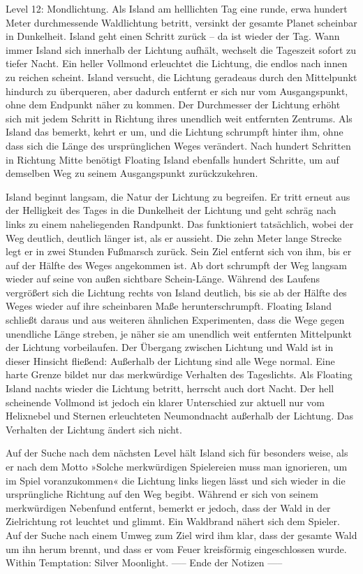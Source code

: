     Level 12: Mondlichtung. Als Island am helllichten Tag eine runde, erwa hundert Meter durchmessende Waldlichtung betritt, versinkt der gesamte Planet scheinbar in Dunkelheit. Island geht einen Schritt zurück – da ist wieder der Tag. Wann immer Island sich innerhalb der Lichtung aufhält, wechselt die Tageszeit sofort zu tiefer Nacht. Ein heller Vollmond erleuchtet die Lichtung, die endlos nach innen zu reichen scheint. Island versucht, die Lichtung geradeaus durch den Mittelpunkt hindurch zu überqueren, aber dadurch entfernt er sich nur vom Ausgangspunkt, ohne dem Endpunkt näher zu kommen. Der Durchmesser der Lichtung erhöht sich mit jedem Schritt in Richtung ihres unendlich weit entfernten Zentrums. Als Island das bemerkt, kehrt er um, und die Lichtung schrumpft hinter ihm, ohne dass sich die Länge des ursprünglichen Weges verändert. Nach hundert Schritten in Richtung Mitte benötigt Floating Island ebenfalls hundert Schritte, um auf demselben Weg zu seinem Ausgangspunkt zurückzukehren.

    Island beginnt langsam, die Natur der Lichtung zu begreifen. Er tritt erneut aus der Helligkeit des Tages in die Dunkelheit der Lichtung und geht schräg nach links zu einem naheliegenden Randpunkt. Das funktioniert tatsächlich, wobei der Weg deutlich, deutlich länger ist, als er aussieht. Die zehn Meter lange Strecke legt er in zwei Stunden Fußmarsch zurück. Sein Ziel entfernt sich von ihm, bis er auf der Hälfte des Weges angekommen ist. Ab dort schrumpft der Weg langsam wieder auf seine von außen sichtbare Schein-Länge. Während des Laufens vergrößert sich die Lichtung rechts von Island deutlich, bis sie ab der Hälfte des Weges wieder auf ihre scheinbaren Maße herunterschrumpft. Floating Island schließt daraus und aus weiteren ähnlichen Experimenten, dass die Wege gegen unendliche Länge streben, je näher sie am unendlich weit entfernten Mittelpunkt der Lichtung vorbeilaufen. Der Übergang zwischen Lichtung und Wald ist in dieser Hinsicht fließend: Außerhalb der Lichtung sind alle Wege normal. Eine harte Grenze bildet nur das merkwürdige Verhalten des Tageslichts.
    Als Floating Island nachts wieder die Lichtung betritt, herrscht auch dort Nacht. Der hell scheinende Vollmond ist jedoch ein klarer Unterschied zur aktuell nur vom Helixnebel und Sternen erleuchteten Neumondnacht außerhalb der Lichtung. Das Verhalten der Lichtung ändert sich nicht.

    Auf der Suche nach dem nächsten Level hält Island sich für besonders weise, als er nach dem Motto »Solche merkwürdigen Spielereien muss man ignorieren, um im Spiel voranzukommen« die Lichtung links liegen lässt und sich wieder in die ursprüngliche Richtung auf den Weg begibt. Während er sich von seinem merkwürdigen Nebenfund entfernt, bemerkt er jedoch, dass der Wald in der Zielrichtung rot leuchtet und glimmt. Ein Waldbrand nähert sich dem Spieler. Auf der Suche nach einem Umweg zum Ziel wird ihm klar, dass der gesamte Wald um ihn herum brennt, und dass er vom Feuer kreisförmig eingeschlossen wurde.
    Within Temptation: Silver Moonlight.
----- Ende der Notizen -----

